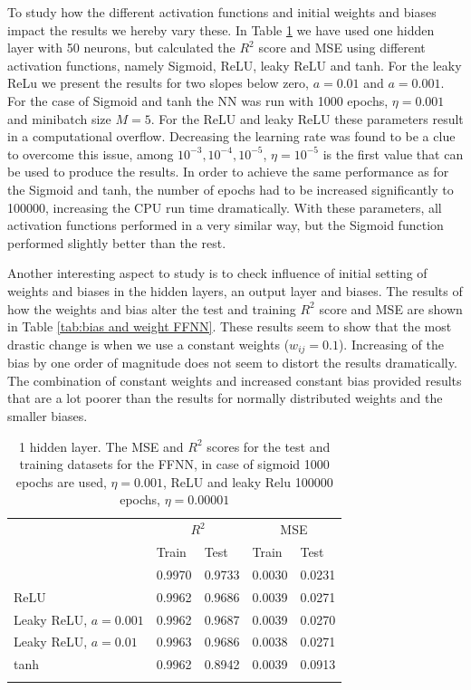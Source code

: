 \documentclass{emulateapj}
\begin{document}
To study how the different activation functions and initial weights and biases impact the results we hereby vary these. In Table \ref{tab:activation functions} we have used one hidden layer with 50 neurons, but calculated the $R^{2}$ score and MSE using different activation functions, namely Sigmoid, ReLU, leaky ReLU and tanh. For the leaky ReLu we present the results for two slopes below zero, $a=0.01$ and $a=0.001$. For the case of Sigmoid and tanh the NN was run with 1000 epochs, $\eta=0.001$ and minibatch size $M=5$. For the ReLU and leaky ReLU these parameters result in a computational overflow. Decreasing the learning rate was found to be a clue to overcome this issue, among $10^{-3},10^{-4},10^{-5}$, $\eta=10^{-5}$ is the first value that can be used to produce the results. In order to achieve the same performance as for the Sigmoid and tanh, the number of epochs had to be increased significantly to 100000, increasing the CPU run time dramatically. With these parameters, all activation functions performed in a very similar way, but the Sigmoid function performed slightly better than the rest. 


Another interesting aspect to study is to check influence of initial setting of weights and biases in the hidden layers, an output layer and biases. The results of how the weights and bias alter the test and training $R^{2}$ score and MSE are shown in Table \ref{tab:bias and weight FFNN}. These results seem to show that the most drastic change is when we use a constant weights ($w_{ij}=0.1$). Increasing of the bias by one order of magnitude does not seem to distort the results dramatically. The combination of constant weights and increased constant bias provided results that are a lot poorer than the results for normally distributed weights and the smaller biases. 

\begin{table}[!htb]
\begin{center}
\caption{1 hidden layer. The MSE and $R^2$ scores for the test and training datasets for the FFNN, in case of sigmoid 1000 epochs are used, $\eta=0.001$, ReLU and leaky Relu 100000 epochs, $\eta=0.00001$ }
\label{tab:activation functions}  
\begin{tabular}{lllll}
\cline{2-5}
\noalign{\smallskip}
\cline{2-5}\noalign{\smallskip}
& \multicolumn{2}{c}{$R^2$} & \multicolumn{2}{c}{MSE}\\
\cline{2-5}\noalign{\smallskip} & Train &  Test  & Train & Test \\
\hline\noalign{\smallskip}
\multicolumn{1}{l|}{Sigmoid} & 0.9970 & 0.9733 & 0.0030 & 0.0231 \\
\multicolumn{1}{l|}{ReLU} & 0.9962 & 0.9686 & 0.0039 & 0.0271 \\
\multicolumn{1}{l|}{Leaky ReLU, $a=0.001$} & 0.9962 & 0.9687 & 0.0039 & 0.0270\\
\multicolumn{1}{l|}{Leaky ReLU, $a=0.01$} & 0.9963 & 0.9686 & 0.0038 & 0.0271\\
\multicolumn{1}{l|}{tanh} & 0.9962 & 0.8942 & 0.0039 & 0.0913
\\\noalign{\smallskip}\hline
\end{tabular}
\end{center}
\end{table}
\end{document}
